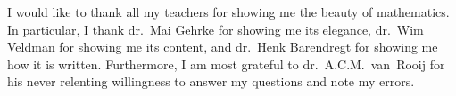 \documentclass[main.tex]{subfiles}
\begin{document}
I would like to thank  all my teachers
for showing me the beauty of mathematics.
In particular, I  thank
dr.~Mai Gehrke for showing me its elegance,
dr.~Wim Veldman for showing me its content, and
dr.~Henk Barendregt for showing me how it is written.
Furthermore, I am most grateful
to dr.~A.C.M.~van~Rooij
for his never relenting willingness 
to answer my questions
and note my errors.
\clearpage
\tableofcontents
\clearpage
\end{document}
